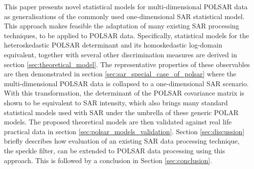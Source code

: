 \documentclass[journal]{IEEEtran}
\begin{document}
This paper presents novel statistical models for multi-dimensional POLSAR data as generalisations of the commonly used one-dimensional SAR statistical model.
This approach makes feasible the adaptation of many existing SAR processing techniques, to be applied to POLSAR data.
Specifically, statistical models for the heteroskedastic POLSAR determinant and its homoskedastic log-domain equivalent, together with several other discrimination measures are derived in section  \ref{sec:theoretical_model}.
The representative properties of these observables are then demonstrated in section \ref{sec:sar_special_case_of_polsar}
  where the multi-dimensional POLSAR data is collapsed to a one-dimensional SAR scenario.
With this transformation, the determinant of the POLSAR covariance matrix is shown to be equivalent to SAR intensity,
  which also brings many standard statistical models used with SAR  under the umbrella of these generic POLAR models.
The proposed theoretical models are then validated against real life practical data in section \ref{sec:polsar_models_validation}.
Section \ref{sec:discussion} briefly describes how evaluation of an existing SAR data processing technique, the speckle filter, can be extended to  POLSAR data processing using this approach.
This is followed by a conclusion in Section \ref{sec:conclusion}.


\end{document}
